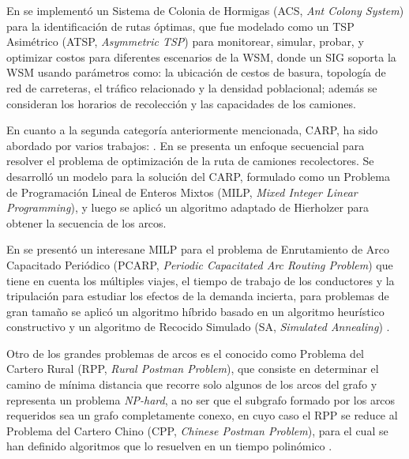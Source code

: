 En \citet{Karadimas2007OptimalAlgorithm} se implementó un Sistema de Colonia de Hormigas (ACS, \textit{Ant Colony System}) para la identificación de rutas óptimas, que fue modelado como un TSP Asimétrico (ATSP, \textit{Asymmetric TSP}) para monitorear, simular, probar, y optimizar costos para diferentes escenarios de la WSM, donde un SIG soporta la WSM usando parámetros como: la ubicación de cestos de basura, topología de red de carreteras, el tráfico relacionado y la densidad poblacional; además se consideran los horarios de recolección y las capacidades de los camiones.

En cuanto a la segunda categoría anteriormente mencionada, CARP, ha sido abordado por varios trabajos: \citet{Vecchi2016ACollection,Tirkolaee2018ATime,Braier2017AnArgentina}. En \citet{Vecchi2016ACollection} se presenta un enfoque secuencial para resolver el problema de optimización de la ruta de camiones recolectores. Se desarrolló un modelo para la solución del CARP, formulado como un Problema de Programación Lineal de Enteros Mixtos (MILP, \textit{Mixed Integer Linear Programming}), y luego se aplicó un algoritmo adaptado de Hierholzer para obtener la secuencia de los arcos. 

En \citet{Tirkolaee2018ATime} se presentó un interesane MILP para el problema de Enrutamiento de Arco Capacitado Periódico (PCARP, \textit{Periodic Capacitated Arc Routing Problem}) que tiene en cuenta los múltiples viajes, el tiempo de trabajo de los conductores y la tripulación para estudiar los efectos de la demanda incierta, para problemas de gran tamaño se aplicó un algoritmo híbrido basado en un algoritmo heurístico constructivo y un algoritmo de Recocido Simulado (SA, \textit{Simulated Annealing}) \citep{Bertsimas1993SimulatedAnnealing}.

Otro de los grandes problemas de arcos es el conocido como Problema del Cartero Rural (RPP, \textit{Rural Postman Problem}), que consiste en determinar el camino de mínima distancia que recorre solo algunos de los arcos del grafo y representa un problema \textit{NP-hard}, a no ser que el subgrafo formado por los arcos requeridos sea un grafo completamente conexo, en cuyo caso el RPP se reduce al Problema del Cartero Chino (CPP, \textit{Chinese Postman Problem}), para el cual se han definido algoritmos que lo resuelven en un tiempo polinómico \citep{CalvinoM2011CooperacionPanoramica}.

